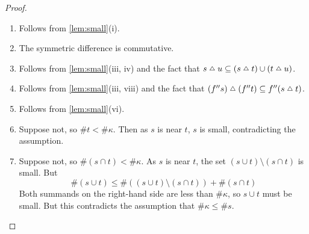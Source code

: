 \begin{proof}
    \begin{enumerate}
        \item Follows from \cref{lem:small}(i).
        \item The symmetric difference is commutative.
        \item Follows from \cref{lem:small}(iii, iv) and the fact that \( s \symmdiff u \subseteq (s \symmdiff t) \cup (t \symmdiff u) \).
        \item Follows from \cref{lem:small}(iii, viii) and the fact that \( (f '' s) \symmdiff (f '' t) \subseteq f '' (s \symmdiff t) \).
        \item Follows from \cref{lem:small}(vi).
        \item Suppose not, so \( \#t < \#\kappa \).
        Then as \( s \) is near \( t \), \( s \) is small, contradicting the assumption.
        \item Suppose not, so \( \#(s \cap t) < \#\kappa \).
        As \( s \) is near \( t \), the set \( (s \cup t) \setminus (s \cap t) \) is small.
        But
        \[ \#(s \cup t) \leq \#((s \cup t) \setminus (s \cap t)) + \#(s \cap t) \]
        Both summands on the right-hand side are less than \( \#\kappa \), so \( s \cup t \) must be small.
        But this contradicts the assumption that \( \#\kappa \leq \#s \).
    \end{enumerate}
\end{proof}

